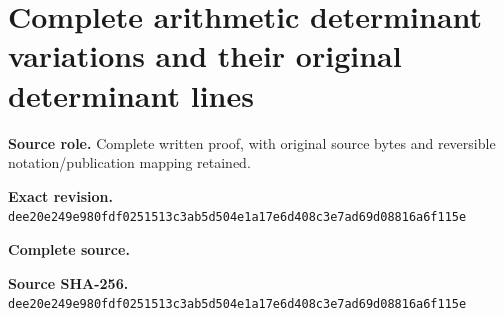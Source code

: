\begingroup
\sloppy
\small
\section{Complete arithmetic determinant variations and their original determinant lines}
\noindent\textbf{Source role.} Complete written proof, with original source bytes and reversible notation/publication mapping retained.\par
\noindent\textbf{Exact revision.} \nolinkurl{dee20e249e980fdf0251513c3ab5d504e1a17e6d408c3e7ad69d08816a6f115e}\par
\noindent\textbf{Complete source.} \par
\noindent\textbf{Source SHA-256.} \nolinkurl{dee20e249e980fdf0251513c3ab5d504e1a17e6d408c3e7ad69d08816a6f115e}\par\medskip

\endgroup
